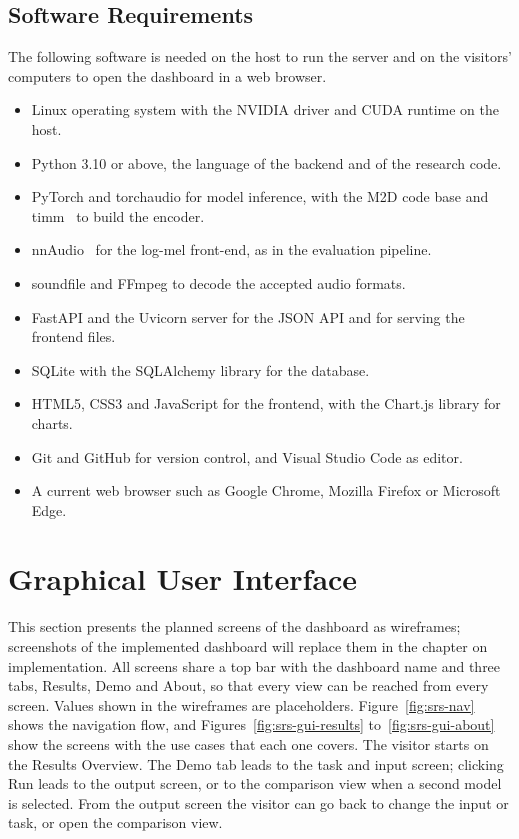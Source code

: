 \documentclass{FastFyp}
\begin{document}
\subsection{Software Requirements}
The following software is needed on the host to run the server and on the visitors' computers to open the dashboard in a web browser.
\begin{itemize}
  \item Linux operating system with the NVIDIA driver and CUDA runtime on the host.
  \item Python 3.10 or above, the language of the backend and of the research code.
  \item PyTorch and torchaudio for model inference, with the M2D code base and timm~\cite{ref:M2DGit} to build the encoder.
  \item nnAudio~\cite{ref:Cheuk:2020nnaudio} for the log-mel front-end, as in the evaluation pipeline.
  \item soundfile and FFmpeg to decode the accepted audio formats.
  \item FastAPI and the Uvicorn server for the JSON API and for serving the frontend files.
  \item SQLite with the SQLAlchemy library for the database.
  \item HTML5, CSS3 and JavaScript for the frontend, with the Chart.js library for charts.
  \item Git and GitHub for version control, and Visual Studio Code as editor.
  \item A current web browser such as Google Chrome, Mozilla Firefox or Microsoft Edge.
\end{itemize}

\section{Graphical User Interface}
\label{sec:srs-gui}
This section presents the planned screens of the dashboard as wireframes; screenshots of the implemented dashboard will replace them in the chapter on implementation. All screens share a top bar with the dashboard name and three tabs, Results, Demo and About, so that every view can be reached from every screen. Values shown in the wireframes are placeholders. Figure~\ref{fig:srs-nav} shows the navigation flow, and Figures~\ref{fig:srs-gui-results} to~\ref{fig:srs-gui-about} show the screens with the use cases that each one covers. The visitor starts on the Results Overview. The Demo tab leads to the task and input screen; clicking Run leads to the output screen, or to the comparison view when a second model is selected. From the output screen the visitor can go back to change the input or task, or open the comparison view.
\end{document}
